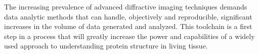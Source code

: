 \documentclass{llncs}
\begin{document}
The increasing prevalence of advanced diffractive imaging techniques
demands data analytic methods that can handle, objectively and
reproducible, significant increases in the volume of data generated
and analyzed. This toolchain is a first step in a process that will
greatly increase the power and capabilities of a widely used approach
to understanding protein structure in living tissue. 

%
%


\scriptsize


\end{document}
